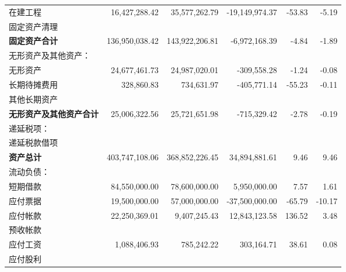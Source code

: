 \begin{longtable}{>{\scriptsize}p{8em}>{\scriptsize}r>{\scriptsize}r>{\scriptsize}r>{\scriptsize}r>{\scriptsize}r}
    \hspace{2ex}在建工程 & 16,427,288.42 & 35,577,262.79 & -19,149,974.37 & -53.83 & -5.19\\
    \hspace{2ex}固定资产清理 &  &  &  &  & 			\\
    \hspace{2ex}\bfseries 固定资产合计 & 136,950,038.42 & 143,922,206.81 & -6,972,168.39 & -4.84 & -1.89\\
无形资产及其他资产： &  &  &  &  & 					\\
    \hspace{2ex}无形资产 & 24,677,461.73 & 24,987,020.01 & -309,558.28 & -1.24 & -0.08\\
    \hspace{2ex}长期待摊费用 & 328,860.83 & 734,631.97 & -405,771.14 & -55.23 & -0.11\\
    \hspace{2ex}其他长期资产 &  &  &  &  & 					\\
    \hspace{2ex}\bfseries 无形资产及其他资产合计 & 25,006,322.56 & 25,721,651.98 & -715,329.42 & -2.78 & -0.19\\
递延税项： &  &  &  &  & 					\\
    \hspace{2ex}递延税款借项 &  &  &  &  & 			\\
    \hspace{2ex}\bfseries 资产总计 & 403,747,108.06 & 368,852,226.45 & 34,894,881.61 & 9.46 & 9.46\\
    \midrule
流动负债： &  &  &  &  & \\					
    \hspace{2ex}短期借款 & 84,550,000.00 & 78,600,000.00 & 5,950,000.00 & 7.57 & 1.61\\
    \hspace{2ex}应付票据 & 19,500,000.00 & 57,000,000.00 & -37,500,000.00 & -65.79 & -10.17\\
    \hspace{2ex}应付帐款 & 22,250,369.01 & 9,407,245.43 & 12,843,123.58 & 136.52 & 3.48\\
    \hspace{2ex}预收帐款 &  &  &  &  & 	\\
    \hspace{2ex}应付工资 & 1,088,406.93 & 785,242.22 & 303,164.71 & 38.61 & 0.08	\\
    \hspace{2ex}应付股利 &  &  &  &  & 	\\

\end{longtable}
